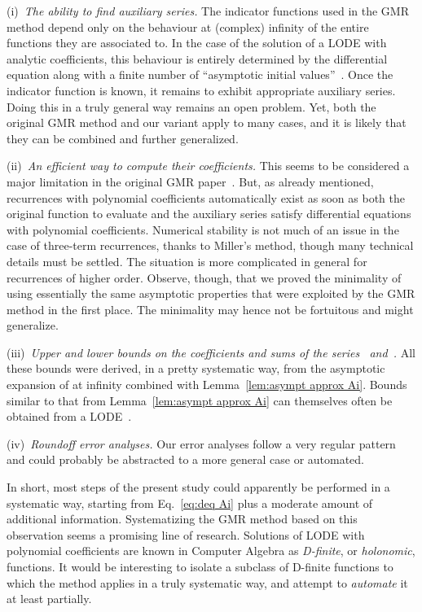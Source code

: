 \documentclass[10pt, conference]{IEEEtran}
\begin{document}
(i)~\emph{The ability to find auxiliary series.}
The indicator functions used in the GMR method depend only on the behaviour at (complex) infinity of the entire functions they are associated to.
In the case of the solution of a LODE with analytic coefficients, this behaviour is entirely determined by the differential equation along with a finite number of ``asymptotic initial values''~\cite{Wasow1965,vdPutSinger2003}.
Once the indicator function is known, it remains to exhibit appropriate auxiliary series.
Doing this in a truly general way remains an open problem.
Yet, both the original GMR method and our variant apply to many cases, and it is likely that they can be combined and further generalized.

(ii)~\emph{An efficient way to compute their coefficients.}
This seems to be considered a major limitation in the original GMR paper~\cite{GawronskiMullerReinhard2007}.
But, as already mentioned, recurrences with polynomial coefficients automatically exist as soon as both the original function to evaluate and the auxiliary series satisfy differential equations with polynomial coefficients.
Numerical stability is not much of an issue in the case of three-term recurrences, thanks to Miller's method, though many technical details must be settled.
The situation is more complicated in general for recurrences of higher order.
Observe, though, that we proved the minimality of  using essentially the same asymptotic properties that were exploited by the GMR method in the first place.
The minimality may hence not be fortuitous and might generalize.

(iii)~\emph{Upper and lower bounds on the coefficients and sums of the series
~and~.}
All these bounds were derived, in a pretty systematic way, from the asymptotic expansion of  at infinity combined with Lemma~\ref{lem:asympt approx Ai}.
Bounds similar to that from Lemma~\ref{lem:asympt approx Ai} can themselves often be obtained from a LODE~\cite{Olver1997}.

(iv)~\emph{Roundoff error analyses.}
Our error analyses follow a very regular pattern and could probably be abstracted to a more general case or automated.

In short, most steps of the present study could apparently be performed in a systematic way, starting from Eq.~\eqref{eq:deq Ai} plus a moderate amount of additional information.
Systematizing the GMR method based on this observation seems a promising line of research.
Solutions of LODE with polynomial coefficients are known in Computer Algebra as \emph{D{-}finite}, or \emph{holonomic}, functions.
It would be interesting to isolate a subclass of D-finite functions to which the method applies in a truly systematic way, and attempt to \emph{automate} it at least partially.
\end{document}
